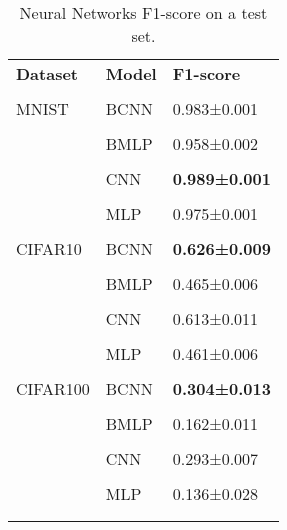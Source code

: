 \begin{table}[]
    \centering
    \footnotesize
    \begin{tabular}{lll}\n\toprule\n \textbf{Dataset} & \textbf{Model} & \textbf{F1-score} \\\\\n\midrule\n  MNIST &  BCNN & 0.983±0.001 \\\\\n      &  BMLP &           0.958±0.002 \\\\\n    &   CNN &           \textbf{0.989±0.001} \\\\\n    &   MLP &           0.975±0.001 \\\\\n CIFAR10 &  BCNN &           \textbf{0.626±0.009} \\\\\n  &  BMLP &           0.465±0.006 \\\\\n  &   CNN &           0.613±0.011 \\\\\n  &   MLP &           0.461±0.006  \\\\\n  CIFAR100 &  BCNN &           \textbf{0.304±0.013} \\\\\n  &  BMLP &           0.162±0.011 \\\\\n  &   CNN &           0.293±0.007 \\\\\n  &   MLP &           0.136±0.028 \\\\\n  \bottomrule\n
    \end{tabular}
    \caption[NN models F1-score on a test set]{Neural Networks F1-score on a test set.}
    \label{tab:bnn_test}
\end{table}